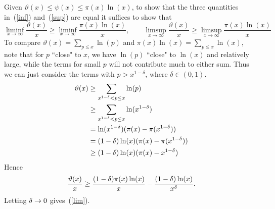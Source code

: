 Given $\vartheta(x)\leq \psi(x)\leq \pi(x)\ln(x)$, to show that the three quantities in~(\ref{inf}) and~(\ref{sup}) are equal it suffices to show that
\begin{equation}\label{lim}
\liminf_{x\to\infty}\frac{\vartheta(x)}{x}\geq \liminf_{x\to \infty}\frac{\pi(x)\ln(x)}{x},\qquad
\limsup_{x\to\infty}\frac{\vartheta(x)}{x}\geq \limsup_{x\to \infty}\frac{\pi(x)\ln(x)}{x}
\end{equation}
To compare $\vartheta(x)=\sum_{p\leq x}\ln(p)$ and $\pi(x)\ln(x)=\sum_{p\leq x}\ln(x)$, note that for $p$ ``close" to $x$, we have $\ln(p)$ ``close" to $\ln(x)$ and relatively large, while the terms for small $p$ will not contribute much to either sum. Thus we %
can just consider the terms with $p>x^{1-\delta}$, where $\delta\in (0,1)$.
\begin{align*}
\vartheta(x)&\geq%
\sum_{x^{1-\de}<p\leq x} \ln(p)\\
&\geq %
\sum_{x^{1-\de}<p\leq x} \ln(x^{1-\delta})\\
&=\ln(x^{1-\de})(\pi(x)-\pi(x^{1-\de}))\\
&=(1-\de)\ln(x)(\pi(x)-\pi(x^{1-\de}))\\
&\geq(1-\de)\ln(x)(\pi(x)-x^{1-\de})
\end{align*}
Hence
\[\frac{\vartheta(x)}{x}\geq\frac{(1-\delta)\pi(x)\ln(x)}{x}-\frac{(1-\delta)\ln(x)}{x^{\delta}}.\]
Letting $\delta\to 0$ gives~(\ref{lim}).
